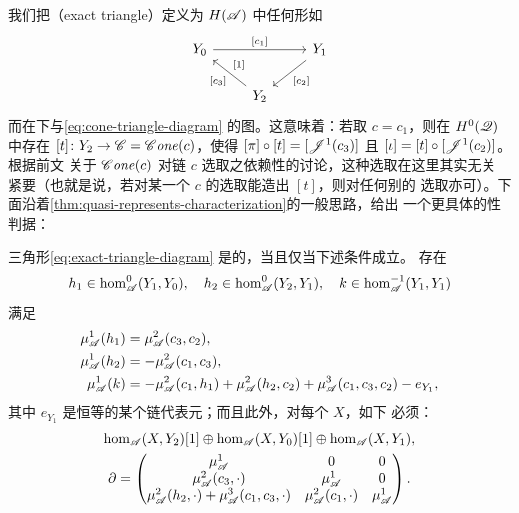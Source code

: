 我们把\textbf{\trExactTriangle}（exact triangle）定义为 $H(\mathscr{A})$ 中任何形如
\begin{equation}\label{eq:exact-triangle-diagram}
\begin{tikzcd}
Y_0 \ar[rr,"{[c_1]}"] && Y_1 \ar[dl,"{[c_2]}"] \\
& Y_2 \ar[ul,"{[c_3]}","{[1]}"{swap}] &
\end{tikzcd}
\end{equation}
而在\trYonedaEmbedding{}下与\eqref{eq:cone-triangle-diagram}
\trIsomorphic{}的图。这意味着：若取 $c=c_1$，则在 $H^0(\mathscr{Q})$ 中存在%
\trIsomorphism{} $[t]\colon Y_2\to\mathscr{C}=\mathscr{C}\mathit{one}(c)$，使得
$[\pi]\circ[t]=[\mathscr{J}^1(c_3)]$ 且 $[\iota]=[t]\circ[\mathscr{J}^1(c_2)]$。根据前文
关于 $\mathscr{C}\mathit{one}(c)$ 对链 $c$ 选取之依赖性的讨论，这种选取在这里其实无关
紧要（也就是说，若对某一个 $c$ 的选取能造出\trIsomorphism{} $[t]$，则对任何别的
选取亦可）。下面沿着\cref{thm:quasi-represents-characterization}的一般思路，给出
一个更具体的\trExact{}性判据：

\begin{lemma}\label{thm:exact-triangle-criterion}
三角形\eqref{eq:exact-triangle-diagram} 是\trExact{}的，当且仅当下述条件成立。
存在
\begin{equation*}
h_1\in\hom^0_{\mathscr{A}}(Y_1,Y_0),\quad
h_2\in\hom^0_{\mathscr{A}}(Y_2,Y_1),\quad
k\in\hom^{-1}_{\mathscr{A}}(Y_1,Y_1)
\end{equation*}
满足
\begin{equation}\label{eq:exactness-equations}
\begin{aligned}
\mu^1_{\mathscr{A}}(h_1)&=\mu^2_{\mathscr{A}}(c_3,c_2),\\
\mu^1_{\mathscr{A}}(h_2)&=-\mu^2_{\mathscr{A}}(c_1,c_3),\\
\mu^1_{\mathscr{A}}(k)&=-\mu^2_{\mathscr{A}}(c_1,h_1)+\mu^2_{\mathscr{A}}(h_2,c_2)
+\mu^3_{\mathscr{A}}(c_1,c_3,c_2)-e_{Y_1},
\end{aligned}
\end{equation}
其中 $e_{Y_1}$ 是恒等的某个链代表元；而且此外，对每个\trObject{} $X$，如下%
\trChainComplex{}必须\trAcyclic：
\begin{equation}\label{eq:exactness-complex}
\begin{gathered}
\hom_{\mathscr{A}}(X,Y_2)[1]\oplus\hom_{\mathscr{A}}(X,Y_0)[1]\oplus\hom_{\mathscr{A}}(X,Y_1),\\
\partial=\begin{pmatrix}
\mu^1_{\mathscr{A}} & 0 & 0\\
\mu^2_{\mathscr{A}}(c_3,\cdot) & \mu^1_{\mathscr{A}} & 0\\
\mu^2_{\mathscr{A}}(h_2,\cdot)+\mu^3_{\mathscr{A}}(c_1,c_3,\cdot) &
\mu^2_{\mathscr{A}}(c_1,\cdot) & \mu^1_{\mathscr{A}}
\end{pmatrix}.
\end{gathered}
\end{equation}
\end{lemma}

